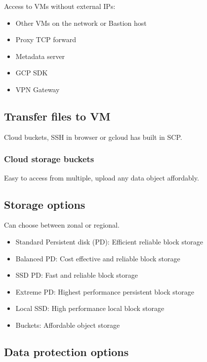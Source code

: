 \documentclass[11pt]{scrartcl} %
\begin{document}
Access to VMs without external IPs:
\begin{itemize}
	\item Other VMs on the network or Bastion host
	\item Proxy TCP forward
	\item Metadata server
	\item GCP SDK
	\item VPN Gateway
\end{itemize}

\subsection{Transfer files to VM}

Cloud buckets, SSH in browser or gcloud has built in SCP.

\subsubsection{Cloud storage buckets}

Easy to access from multiple, upload any data object affordably.

\subsection{Storage options}

Can choose between zonal or regional.

\begin{itemize}
	\item Standard Persistent disk (PD): Efficient reliable block storage
	\item Balanced PD: Cost effective and reliable block storage
	\item SSD PD: Fast and reliable block storage
	\item Extreme PD: Highest performance persistent block storage
	\item Local SSD: High performance local block storage
	\item Buckets: Affordable object storage
\end{itemize}

\subsection{Data protection options}
\end{document}
